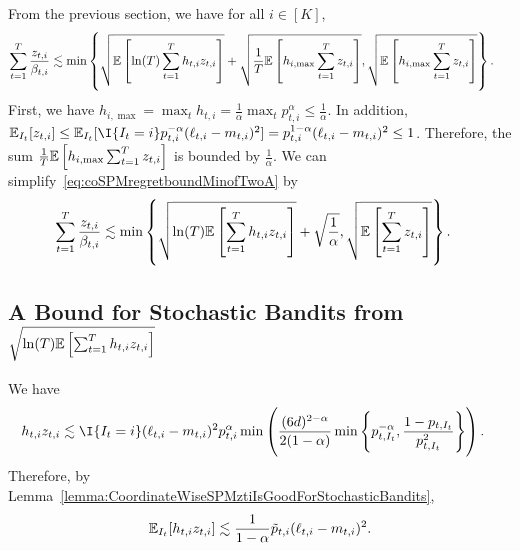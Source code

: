 From the previous section, we have for all $i \in [K]$,
\begin{align}
    \sum_{t=1}^T \frac{z_{t,i}}{\beta_{t,i}} &\lesssim \min\left\{ \sqrt{\mathbb{E}\left[\ln(T)\sum_{t=1}^T h_{t,i} z_{t,i}\right]} + \sqrt{\frac{1}{T}\mathbb{E}\left[h_{i, \max}\sum_{t=1}^T z_{t,i}\right]}, \sqrt{\mathbb{E}\left[h_{i, \max}\sum_{t=1}^T z_{t,i}\right]} \right\}.\
    \label{eq:coSPMregretboundMinofTwoA}
\end{align}
First, we have $h_{i, \max} = \max_{t} h_{t,i} = \frac{1}{\alpha} \max_{t} p_{t,i}^\alpha \leq \frac{1}{\alpha}$. 
In addition, $\E_{I_t}[z_{t,i}] \leq \E_{I_t}[\I{I_t = i}p_{t,i}^{-\alpha}(\ell_{t,i} - m_{t,i})^2] = p_{t,i}^{1-\alpha}(\ell_{t,i} - m_{t,i})^2 \leq 1$. 
Therefore, the sum $\frac{1}{T}\mathbb{E}\left[h_{i, \max}\sum_{t=1}^T z_{t,i}\right]$ is bounded by $\frac{1}{\alpha}$. We can simplify~\eqref{eq:coSPMregretboundMinofTwoA} by
\begin{align}
    \sum_{t=1}^T \frac{z_{t,i}}{\beta_{t,i}} &\lesssim \min\left\{\sqrt{\ln(T)\mathbb{E}\left[\sum_{t=1}^T h_{t,i} z_{t,i}\right]} + \sqrt{\frac{1}{\alpha}}, \sqrt{\mathbb{E}\left[\sum_{t=1}^T z_{t,i}\right]} \right\}.
    \label{eq:coSPMregretboundMinofTwoB}
\end{align}

\subsection*{A Bound for Stochastic Bandits from $\sqrt{\ln(T)\mathbb{E}\left[\sum_{t=1}^T h_{t,i} z_{t,i}\right]}$}

We have
\begin{align*}
    h_{t,i} z_{t,i} &\lesssim \I{I_t = i} (\ell_{t,i} - m_{t,i})^2 p_{t,i}^\alpha \min\left( \frac{(6d)^{2-\alpha}}{2(1-\alpha)}\min\left\{p_{t,I_t}^{-\alpha}, \frac{1 - p_{t,I_t}}{p_{t,I_t}^2}\right\}\right).
\end{align*}
Therefore, by Lemma~\ref{lemma:CoordinateWiseSPMztiIsGoodForStochasticBandits},
\begin{align*}
    \mathbb{E}_{I_t}[h_{t,i} z_{t,i}] \lesssim \frac{1}{1-\alpha}\tilde{p}_{t,i}(\ell_{t,i} - m_{t,i})^2.
\end{align*}

